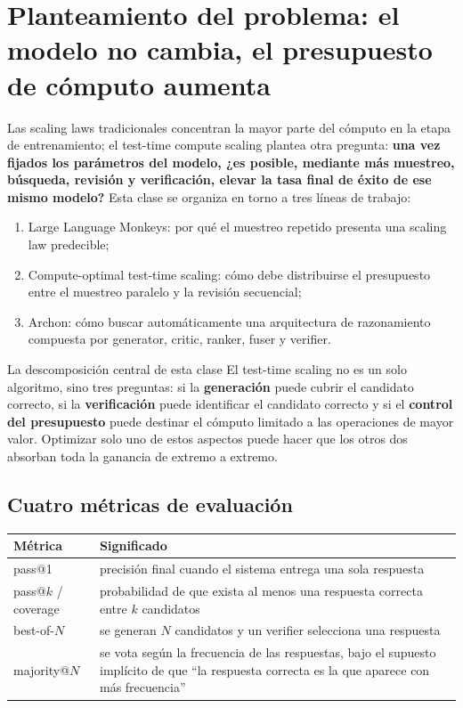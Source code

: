 \section{Planteamiento del problema: el modelo no cambia, el presupuesto de cómputo aumenta}

Las scaling laws tradicionales concentran la mayor parte del cómputo en la etapa de entrenamiento; el test-time compute scaling plantea otra pregunta: \textbf{una vez fijados los parámetros del modelo, ¿es posible, mediante más muestreo, búsqueda, revisión y verificación, elevar la tasa final de éxito de ese mismo modelo?} Esta clase se organiza en torno a tres líneas de trabajo:

\begin{enumerate}
    \item Large Language Monkeys: por qué el muestreo repetido presenta una scaling law predecible;
    \item Compute-optimal test-time scaling: cómo debe distribuirse el presupuesto entre el muestreo paralelo y la revisión secuencial;
    \item Archon: cómo buscar automáticamente una arquitectura de razonamiento compuesta por generator, critic, ranker, fuser y verifier.
\end{enumerate}

\begin{importantbox}{La descomposición central de esta clase}
El test-time scaling no es un solo algoritmo, sino tres preguntas: si la \textbf{generación} puede cubrir el candidato correcto, si la \textbf{verificación} puede identificar el candidato correcto y si el \textbf{control del presupuesto} puede destinar el cómputo limitado a las operaciones de mayor valor. Optimizar solo uno de estos aspectos puede hacer que los otros dos absorban toda la ganancia de extremo a extremo.
\end{importantbox}

\subsection{Cuatro métricas de evaluación}

\begin{table}[H]
\centering
\begin{tabular}{p{3.1cm}p{10.5cm}}
\toprule
\textbf{Métrica} & \textbf{Significado} \\
\midrule
pass@1 & precisión final cuando el sistema entrega una sola respuesta \\
pass@$k$ / coverage & probabilidad de que exista al menos una respuesta correcta entre $k$ candidatos \\
best-of-$N$ & se generan $N$ candidatos y un verifier selecciona una respuesta \\
majority@$N$ & se vota según la frecuencia de las respuestas, bajo el supuesto implícito de que \enquote{la respuesta correcta es la que aparece con más frecuencia} \\
\bottomrule
\end{tabular}
\end{table}

